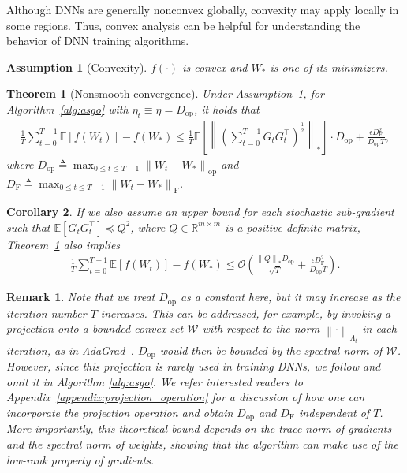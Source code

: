 \documentclass{article}
\newtheorem{theorem}{Theorem}
\newtheorem{corollary}[theorem]{Corollary}
\newtheorem{remark}{Remark}
\newtheorem{assumption}{Assumption}
\theoremstyle{remark}
\newcommand{\Norm}[1]{\left\|#1\right\|}
\newcommand{\cW}{\mathcal{W}}
\newcommand{\EE}{\mathbb{E}}
\newcommand{\cO}{\mathcal{O}}
\newcommand{\RR}{\mathbb{R}}
\begin{document}
Although DNNs are generally nonconvex globally, convexity may apply locally in some regions. Thus, convex analysis can be helpful for understanding the behavior of DNN training algorithms.
\begin{assumption}[Convexity]\label{asm:convex}
    $f(\cdot)$ is convex and $W_*$ is one of its minimizers.
\end{assumption}


\begin{theorem}[Nonsmooth convergence]\label{thm:nonsmooth}
    Under Assumption~\ref{asm:convex}, for Algorithm~\ref{alg:asgo} with $\eta_t \equiv \eta = D_{\mathrm{op}}$, it holds that
    \begin{align*}
        \frac{1}{T} \sum_{t=0}^{T-1} \EE[f(W_t)] - f(W_*) \le
        \frac{1}{T} \EE\left[ \Norm{\left( \sum_{t=0}^{T-1} G_t G_t^\top \right)^{\frac{1}{2}}}_* \right] \cdot D_{\mathrm{op}} + \frac{\epsilon D_{\mathrm{F}}^2}{D_{\mathrm{op}} T},
    \end{align*}
    where $D_{\mathrm{op}} \triangleq \max_{0\le t\le T-1}\Norm{W_t - W_*}_{\mathrm{op}}$ and $D_{\mathrm{F}} \triangleq \max_{0\le t\le T-1}\Norm{W_t - W_*}_{\mathrm{F}}$.
\end{theorem}

\begin{corollary}\label{cor:nonsmooth_convergence}
    If we also assume an upper bound for each stochastic sub-gradient such that $\EE\left[ G_t G_t^\top \right] \preceq Q^2$, where $Q \in \RR^{m\times m}$ is a positive definite matrix, Theorem~\ref{thm:nonsmooth} also implies
    \begin{align*}
        \frac{1}{T} \sum_{t=0}^{T-1} \EE[f(W_t)] - f(W_*) \le \cO\left( \frac{\Norm{Q}_* D_{\mathrm{op}}}{\sqrt{T}} + \frac{\epsilon D_{\mathrm{F}}^2}{D_{\mathrm{op}} T} \right) .
    \end{align*}
\end{corollary}

\begin{remark}
    { Note that we treat $D_{\mathrm{op}}$ as a constant here, but it may increase as the iteration number $T$ increases. This can be addressed, for example, by invoking a projection onto a bounded convex set $\cW$ with respect to the norm $\Norm{\cdot}_{\Lambda_t}$ in each iteration, as in AdaGrad~\citep{duchi2011adaptive}. $D_{\mathrm{op}}$ would then be bounded by the spectral norm of $\cW$. However, since this projection is rarely used in training DNNs, we follow \citet{gupta2018shampoo} and omit it in Algorithm \ref{alg:asgo}. We refer interested readers to Appendix~\ref{appendix:projection_operation} for
    a discussion of how one can incorporate the projection operation and obtain $D_{\mathrm{op}}$ and $D_{\mathrm{F}}$ independent of $T$. More importantly, this theoretical bound depends on the trace norm of gradients and the spectral norm of weights, showing that the algorithm can make use of the low-rank property of gradients.
}
\end{remark}
\end{document}
